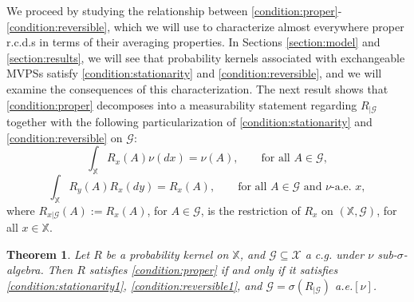 \documentclass[a4paper]{article}
\theoremstyle{plain}
\newtheorem{theorem}{Theorem}
\theoremstyle{remark}
\theoremstyle{definition}
\begin{document}
We proceed by studying the relationship between \eqref{condition:proper}-\eqref{condition:reversible}, which we will use to characterize almost everywhere proper r.c.d.s in terms of their averaging properties. In Sections \ref{section:model} and \ref{section:results}, we will see that probability kernels associated with exchangeable MVPSs satisfy \eqref{condition:stationarity} and \eqref{condition:reversible}, and we will examine the consequences of this characterization. The next result shows that \eqref{condition:proper} decomposes into a measurability statement regarding $R_{|\mathcal{G}}$ together with the following particularization of \eqref{condition:stationarity} and \eqref{condition:reversible} on $\mathcal{G}$:
\begin{equation}\label{condition:stationarity1}\tag{$B'$}
\int_\mathbb{X}R_x(A)\nu(dx)=\nu(A),\qquad\mbox{for all }A\in\mathcal{G},
\end{equation} 
\begin{equation}\label{condition:reversible1}\tag{$C'$}
\int_\mathbb{X}R_y(A)R_x(dy)=R_x(A),\qquad\mbox{for all }A\in\mathcal{G}\mbox{ and }\nu\mbox{-a.e. }x,
\end{equation}
where $R_{x|\mathcal{G}}(A):=R_x(A)$, for $A\in\mathcal{G}$, is the restriction of $R_x$ on $(\mathbb{X},\mathcal{G})$, for all $x\in\mathbb{X}$. 

\begin{theorem}\label{result:prelim:kernels:rcd}
Let $R$ be a probability kernel on $\mathbb{X}$, and $\mathcal{G}\subseteq\mathcal{X}$ a c.g. under $\nu$ sub-$\sigma$-algebra. Then $R$ satisfies \eqref{condition:proper} if and only if it satisfies \eqref{condition:stationarity1}, \eqref{condition:reversible1}, and $\mathcal{G}=\sigma(R_{|\mathcal{G}})$ a.e.$[\nu]$.
\end{theorem}
\end{document}

